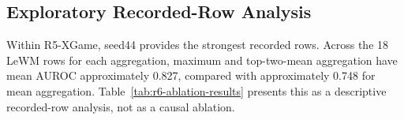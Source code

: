 \subsection{Exploratory Recorded-Row Analysis}

Within R5-XGame, seed44 provides the strongest recorded rows. Across the 18 LeWM rows for each
aggregation, maximum and top-two-mean aggregation have mean AUROC approximately 0.827, compared
with approximately 0.748 for mean aggregation. Table~\ref{tab:r6-ablation-results} presents this
as a descriptive recorded-row analysis, not as a causal ablation.


